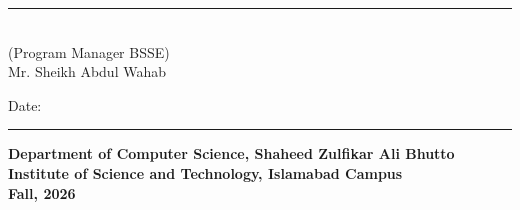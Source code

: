 \vspace{1.5cm}

\begin{center}
\begin{minipage}{0.48\textwidth}
\centering
\rule{6cm}{0.4pt}\\[4pt]
(Program Manager BSSE)\\
Mr. Sheikh Abdul Wahab
\end{minipage}
\end{center}

\vspace{1cm}

\begin{center}
Date: \rule{4.5cm}{0.4pt}
\end{center}

\vfill

\begin{center}
\normalsize\textbf{Department of Computer Science, Shaheed Zulfikar Ali Bhutto Institute of Science and Technology, Islamabad Campus}\\
\vspace{6pt}
\normalsize\textbf{Fall, 2026}
\end{center}